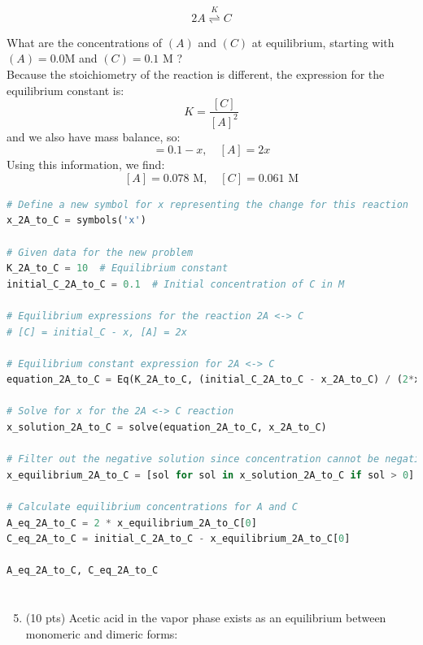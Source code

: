 \documentclass[12 pt]{article}
\begin{document}
$$
2 A \stackrel{K}{\rightleftharpoons} C
$$

What are the concentrations of $(A)$ and $(C)$ at equilibrium, starting with $(A)=0.0 \mathrm{M}$ and $(C)=0.1$ $\mathrm{M}$ ?\\
Because the stoichiometry of the reaction is different, the expression for the equilibrium constant is:
\begin{equation}
  K = \frac{[C]}{[A]^2}
\end{equation}
and we also have mass balance, so:
\begin{equation}
  [C] = 0.1 - x, \quad [A] = 2x
\end{equation}
Using this information, we find:
\begin{equation}
\boxed{[A] = 0.078 \text{ M}, \quad [C] = 0.061 \text{ M}}
\end{equation}
\begin{lstlisting}[language=Python]
# Define a new symbol for x representing the change for this reaction
x_2A_to_C = symbols('x')

# Given data for the new problem
K_2A_to_C = 10  # Equilibrium constant
initial_C_2A_to_C = 0.1  # Initial concentration of C in M

# Equilibrium expressions for the reaction 2A <-> C
# [C] = initial_C - x, [A] = 2x

# Equilibrium constant expression for 2A <-> C
equation_2A_to_C = Eq(K_2A_to_C, (initial_C_2A_to_C - x_2A_to_C) / (2*x_2A_to_C)**2)

# Solve for x for the 2A <-> C reaction
x_solution_2A_to_C = solve(equation_2A_to_C, x_2A_to_C)

# Filter out the negative solution since concentration cannot be negative
x_equilibrium_2A_to_C = [sol for sol in x_solution_2A_to_C if sol > 0]

# Calculate equilibrium concentrations for A and C
A_eq_2A_to_C = 2 * x_equilibrium_2A_to_C[0]
C_eq_2A_to_C = initial_C_2A_to_C - x_equilibrium_2A_to_C[0]

A_eq_2A_to_C, C_eq_2A_to_C

\end{lstlisting}

\section{}
\begin{enumerate}
  \setcounter{enumi}{4}
  \item (10 pts) Acetic acid in the vapor phase exists as an equilibrium between monomeric and dimeric forms:
\end{enumerate}
\end{document}
